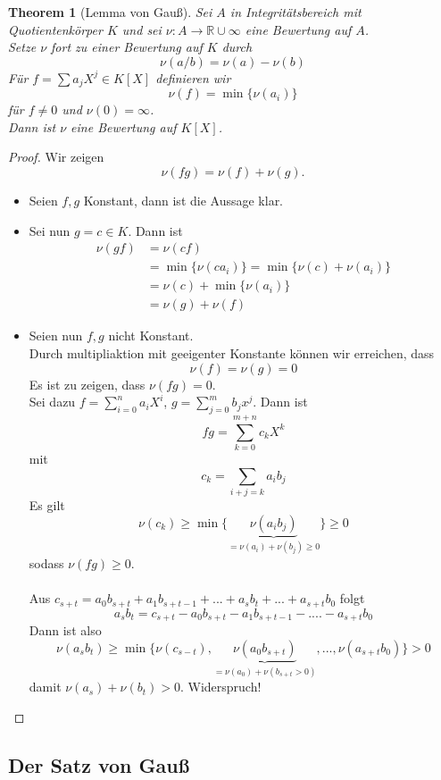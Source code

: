\documentclass[10pt,a4paper]{article}
\newcommand{\R}{\ensuremath{\mathbb{R}}}
\theoremstyle{plain}
\newtheorem{theorem}{Theorem}[section]
\theoremstyle{definition}
\theoremstyle{remark}
\begin{document}
	\begin{theorem}[Lemma von Gauß]
		Sei $A$ in Integritätsbereich mit Quotientenkörper $K$ und sei $\nu:A\to\R\cup\infty$ eine Bewertung auf $A$.\\
		Setze $\nu$ fort zu einer Bewertung auf $K$ durch
		\[\nu(a/b)=\nu(a)-\nu(b)\]
		Für $f=\sum a_jX^j\in K[X]$ definieren wir
		\[\nu(f)=\min\{\nu(a_i)\}\]
		für $f\neq0$ und $\nu(0)=\infty$.\\
		Dann ist $\nu$ eine Bewertung auf $K[X]$.
	\end{theorem}
	\begin{proof}

		Wir zeigen
		\[\nu(fg)=\nu(f)+\nu(g).\]
		\begin{itemize}
			\item Seien $f,g$ Konstant, dann ist die Aussage klar.\\
			\item Sei nun $g=c\in K$. Dann ist 
				\begin{align*}
				\nu(gf)&=\nu(cf)\\
				&=\min\{\nu(ca_i)\}=\min\{\nu(c)+\nu(a_i)\}\\
				&=\nu(c)+\min\{\nu(a_i)\}\\
				&=\nu(g)+\nu(f)
				\end{align*}
			\item Seien nun $f,g$ nicht Konstant.\\
			Durch multipliaktion mit geeigenter Konstante können wir erreichen, dass 
			\[\nu(f)=\nu(g)=0\]
			Es ist zu zeigen, dass $\nu (fg)=0$.\\
			Sei dazu $f=\sum_{i=0}^{n}a_iX^i$, $g=\sum_{j=0}^mb_jx^j$. Dann ist
			\[fg=\sum_{k=0}^{m+n}c_kX^k\]
			mit
			\[c_k=\sum_{i+j=k}a_ib_j\]
			Es gilt
			\[\nu(c_k)\geq \min\{\underbrace{\nu(a_ib_j)}_{=\nu(a_i)+\nu(b_j)\geq 0}\}\geq 0\]
			sodass $\nu(fg)\geq 0$.\\
			\\
			Aus $c_{s+t}=a_0b_{s+t}+a_1b_{s+t-1}+...+a_sb_t+...+a_{s+t}b_0$ folgt
			\[a_sb_t=c_{s+t}-a_0b_{s+t}-a_1b_{s+t-1}-....-a_{s+t}b_0\]
			Dann ist also
			\[\nu(a_sb_t)\geq \min\{\nu(c_{s-t}),\underbrace{\nu(a_0b_{s+t})}_{=\nu(a_0)+\nu(b_{s+t}>0)},...,\nu(a_{s+t}b_0)\}>0\]
			damit $\nu(a_s)+\nu(b_t)>0$. Widerspruch!
		\end{itemize}
	\end{proof}

	\subsection{Der Satz von Gauß}
\end{document}
